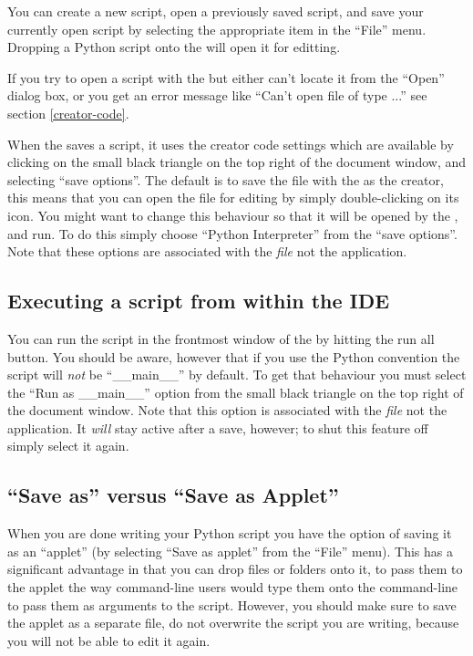 You can create a new script, open a previously saved script, and save
your currently open script by selecting the appropriate item in the
``File'' menu. Dropping a Python script onto the
 will open it for editting.

If you try to open a script with the  but either
can't locate it from the ``Open'' dialog box, or you get an error
message like ``Can't open file of type ...'' see section
\ref{creator-code}.

When the  saves a script, it uses the creator code
settings which are available by clicking on the small black triangle
on the top right of the document window, and selecting ``save
options''. The default is to save the file with the  as the creator, this means that you can open the file for editing
by simply double-clicking on its icon. You might want to change this
behaviour so that it will be opened by the
, and run. To do this simply choose
``Python Interpreter'' from the ``save options''. Note that these
options are associated with the \emph{file} not the application.


\subsection{Executing a script from within the IDE
            \label{IDEexecution}}

You can run the script in the frontmost window of the  by hitting the run all button.  You should be aware, however that
if you use the Python convention  the
script will \emph{not} be ``__main__'' by default. To get that
behaviour you must select the ``Run as __main__'' option from the
small black triangle on the top right of the document window.  Note
that this option is associated with the \emph{file} not the
application. It \emph{will} stay active after a save, however; to shut
this feature off simply select it again.
 

\subsection{``Save as'' versus ``Save as Applet''
            \label{IDEapplet}}

When you are done writing your Python script you have the option of
saving it as an ``applet'' (by selecting ``Save as applet'' from the
``File'' menu). This has a significant advantage in that you can drop
files or folders onto it, to pass them to the applet the way
command-line users would type them onto the command-line to pass them
as arguments to the script. However, you should make sure to save the
applet as a separate file, do not overwrite the script you are
writing, because you will not be able to edit it again.

